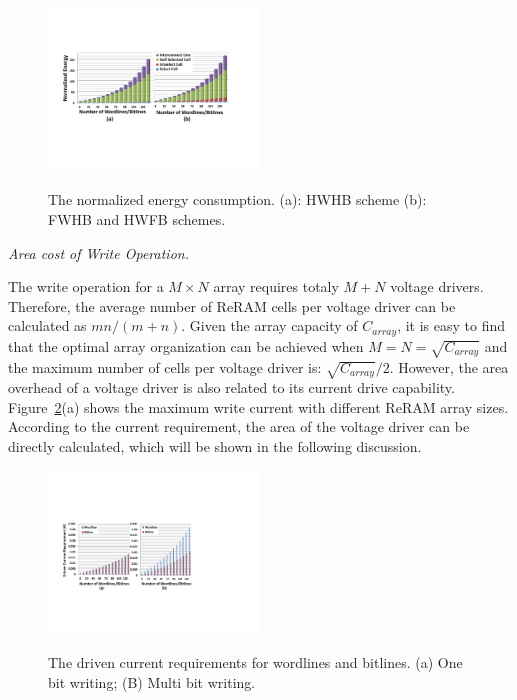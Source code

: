 \begin{figure}%
\centering
  \includegraphics[width=0.5\textwidth]{./figures/energy_f.pdf}\\
  \caption{The normalized energy consumption. (a): HWHB scheme (b): FWHB and HWFB schemes.}\label{fig:energy}
    \vspace{-10pt}
\end{figure}

\vspace{6pt} \emph{Area cost of Write Operation.} \vspace{6pt}

The write operation for a $M \times N$ array requires totaly $M+N$ voltage drivers. Therefore, the average number of ReRAM cells per voltage driver can be calculated as $mn/(m+n)$. Given the array capacity of $C_{array}$, it is easy to find that the optimal array organization can be achieved when $M=N=\sqrt{C_{array}}$ and the maximum number of cells per voltage driver is: $\sqrt{C_{array}}/2$. However, the area overhead of a voltage driver is also related to its current drive capability. Figure~\ref{fig:drive_i}(a) shows the maximum write current with different ReRAM array sizes. According to the current requirement, the area of the voltage driver can be directly calculated, which will be shown in the following discussion.

\begin{figure}%
\centering
  \includegraphics[width=0.5\textwidth]{./figures/drive_i_f.pdf}\\
  \caption{The driven current requirements for wordlines and bitlines. (a) One bit writing; (B) Multi bit writing.}\label{fig:drive_i}
\end{figure}


